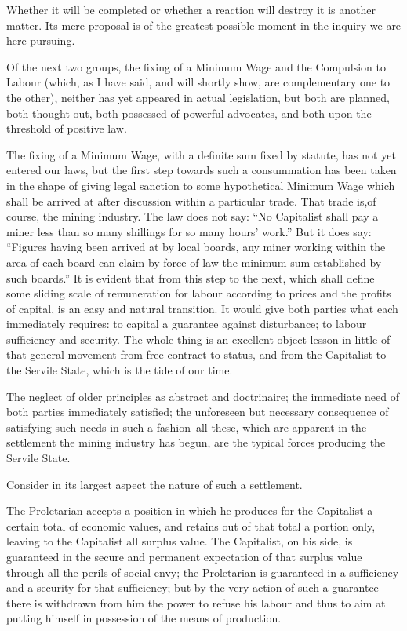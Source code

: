 \documentclass{book}
\begin{document}
Whether it will be completed or whether a reaction will destroy it is another matter. Its mere proposal is of the greatest possible moment in the inquiry we are here pursuing.

Of the next two groups, the fixing of a Minimum Wage and the Compulsion to Labour (which, as I have said, and will shortly show, are complementary one to the other), neither has yet appeared in actual legislation, but both are planned, both thought out, both possessed of powerful advocates, and both upon the threshold of positive law.

The fixing of a Minimum Wage, with a definite sum fixed by statute, has not yet entered our laws, but the first step towards such a consummation has been taken in the shape of giving legal sanction to some hypothetical Minimum Wage which shall be arrived at after discussion within a particular trade. That trade is,of course, the mining industry. The law does not say: “No Capitalist shall pay a miner less than so many shillings for so many hours’ work.” But it does say: “Figures having been arrived at by local boards, any miner working within the area of each board can claim by force of law the minimum sum established by such boards.” It is evident that from this step to the next, which shall define some sliding scale of remuneration for labour according to prices and the profits of capital, is an easy and natural transition. It would give both parties what each immediately requires: to capital a guarantee against disturbance; to labour sufficiency and security. The whole thing is an excellent object lesson in little of that general movement from free contract to status, and from the Capitalist to the Servile State, which is the tide of our time.

The neglect of older principles as abstract and doctrinaire; the immediate need of both parties immediately satisfied; the unforeseen but necessary consequence of satisfying such needs in such a fashion–all these, which are apparent in the settlement the mining industry has begun, are the typical forces producing the Servile State.

Consider in its largest aspect the nature of such a settlement.

The Proletarian accepts a position in which he produces for the Capitalist a certain total of economic values, and retains out of that total a portion only, leaving to the Capitalist all surplus value. The Capitalist, on his side, is guaranteed in the secure and permanent expectation of that surplus value through all the perils of social envy; the Proletarian is guaranteed in a sufficiency and a security for that sufficiency; but by the very action of such a guarantee there is withdrawn from him the power to refuse his labour and thus to aim at putting himself in possession of the means of production.
\end{document}
